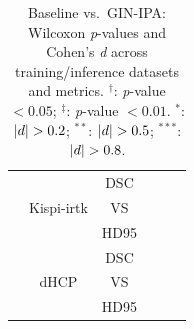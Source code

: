 \begin{table}[htbp]
\begin{tabular}{c|c|c|c|c|c}
        \hhline{~-----}
            & \multirow{3}{*}{Kispi-irtk} & DSC  &  &  &  \\
            &                             & VS   &  &  &  \\
            &                             & HD95 &  &  &  \\
        \hhline{~-----}
            & \multirow{3}{*}{dHCP} & DSC  &  &  &  \\
            &                       & VS   &  &  &  \\
            &                       & HD95 &  &  &  \\
        \bottomrule
    \end{tabular}
    \caption{Baseline vs.\ GIN-IPA: Wilcoxon \textit{p}-values and Cohen's \textit{d} across training/inference datasets and metrics. ${ }^{\dagger}$: \textit{p}-value $< 0.05$; ${ }^{\ddagger}$: \textit{p}-value $<0.01$. ${ }^{*}$: $\lvert d\rvert>0.2$; ${ }^{**}$: $\lvert d\rvert>0.5$; ${ }^{***}$: $\lvert d\rvert>0.8$.}
    \label{tab:baseline-vs-ginipa-stats}
\end{table}

